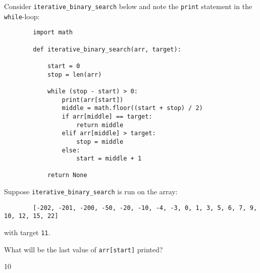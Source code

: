 \begin{prob}
    Consider \texttt{iterative_binary_search} below and note the
    \texttt{print} statement in the
    \texttt{while}-loop:

    \begin{verbatim}
        import math

        def iterative_binary_search(arr, target):

            start = 0
            stop = len(arr)

            while (stop - start) > 0:
                print(arr[start])
                middle = math.floor((start + stop) / 2)
                if arr[middle] == target:
                    return middle
                elif arr[middle] > target:
                    stop = middle
                else:
                    start = middle + 1

            return None
    \end{verbatim}

    Suppose \texttt{iterative_binary_search}
    is run on the array:

    \begin{verbatim}
        [-202, -201, -200, -50, -20, -10, -4, -3, 0, 1, 3, 5, 6, 7, 9, 10, 12, 15, 22]
    \end{verbatim}

    with target \texttt{11}.

    What will be the last value of \texttt{arr[start]} printed?

    \begin{soln}
        10
    \end{soln}
\end{prob}
